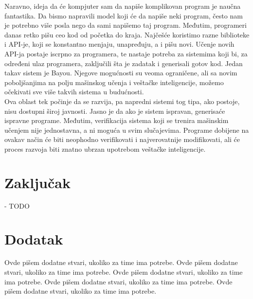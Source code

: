 \documentclass[a4paper]{article}
\begin{document}
Naravno, ideja da će kompjuter sam da napiše komplikovan program je naučna fantastika. Da bismo napravili model koji će da napiše neki program, često nam je potrebno više posla nego da sami napišemo taj program. Međutim, programeri danas retko pišu ceo kod od početka do kraja. Najčešće koristimo razne biblioteke i API-je, koji se konstantno menjaju, unapređuju, a i pišu novi. Učenje novih API-ja postaje iscrpno za programera, te nastaje potreba za sistemima koji bi, za određeni ulaz programera, zaključili šta je zadatak i generisali gotov kod. Jedan takav sistem je Bayou\cite{bayou}. Njegove mogućnosti su veoma ograničene, ali sa novim poboljšanjima na polju mašinskog učenja i veštačke inteligencije, možemo očekivati sve više takvih sistema u budućnosti. \\

Ova oblast tek počinje da se razvija, pa napredni sistemi tog tipa, ako postoje, nisu dostupni široj javnosti. Jasno je da ako je sistem ispravan, generisaće ispravne programe. Međutim, verifikacija sistema koji se trenira mašinskim učenjem nije jednostavna, a ni moguća u svim slučajevima. Programe dobijene na ovakav način će biti neophodno verifikovati i najverovatnije modifikovati, ali će proces razvoja biti znatno ubrzan upotrebom veštačke inteligencije. 

\section{Zaključak}
\label{sec:zakljucak}

- TODO \\

\appendix
 


\appendix
\section{Dodatak}
Ovde pišem dodatne stvari, ukoliko za time ima potrebe.
Ovde pišem dodatne stvari, ukoliko za time ima potrebe.
Ovde pišem dodatne stvari, ukoliko za time ima potrebe.
Ovde pišem dodatne stvari, ukoliko za time ima potrebe.
Ovde pišem dodatne stvari, ukoliko za time ima potrebe.
\end{document}
